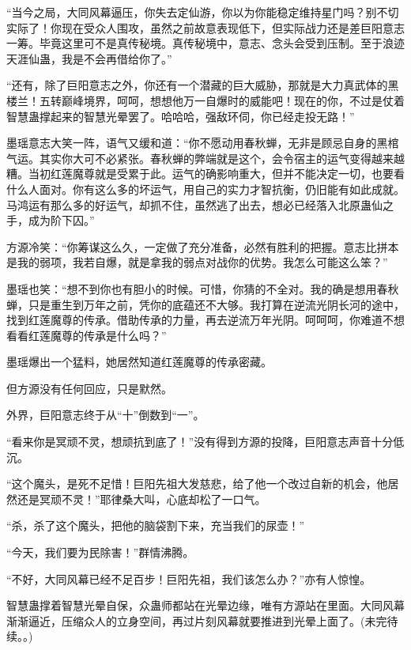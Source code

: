 \begin{this_body}
“当今之局，大同风幕逼压，你失去定仙游，你以为你能稳定维持星门吗？别不切实际了！你现在受众人围攻，虽然之前故意表现低下，但实际战力还是差巨阳意志一筹。毕竟这里可不是真传秘境。真传秘境中，意志、念头会受到压制。至于浪迹天涯仙蛊，我是不会再借给你了。”

“还有，除了巨阳意志之外，你还有一个潜藏的巨大威胁，那就是大力真武体的黑楼兰！五转巅峰境界，呵呵，想想他万一自爆时的威能吧！现在的你，不过是仗着智慧蛊撑起来的智慧光晕罢了。哈哈哈，强敌环伺，你已经走投无路！”

墨瑶意志大笑一阵，语气又缓和道：“你不愿动用春秋蝉，无非是顾忌自身的黑棺气运。其实你大可不必紧张。春秋蝉的弊端就是这个，会令宿主的运气变得越来越糟。当初红莲魔尊就是受累于此。运气的确影响重大，但并不能决定一切，也要看什么人面对。你有这么多的坏运气，用自己的实力才智抗衡，仍旧能有如此成就。马鸿运有那么多的好运气，却抓不住，虽然逃了出去，想必已经落入北原蛊仙之手，成为阶下囚。”

方源冷笑：“你筹谋这么久，一定做了充分准备，必然有胜利的把握。意志比拼本是我的弱项，我若自爆，就是拿我的弱点对战你的优势。我怎么可能这么笨？”

墨瑶也笑：“想不到你也有胆小的时候。可惜，你猜的不全对。我的确是想用春秋蝉，只是重生到万年之前，凭你的底蕴还不大够。我打算在逆流光阴长河的途中，找到红莲魔尊的传承。借助传承的力量，再去逆流万年光阴。呵呵呵，你难道不想看看红莲魔尊的传承是什么吗？”

墨瑶爆出一个猛料，她居然知道红莲魔尊的传承密藏。

但方源没有任何回应，只是默然。

外界，巨阳意志终于从“十”倒数到“一”。

“看来你是冥顽不灵，想顽抗到底了！”没有得到方源的投降，巨阳意志声音十分低沉。

“这个魔头，是死不足惜！巨阳先祖大发慈悲，给了他一个改过自新的机会，他居然还是冥顽不灵！”耶律桑大叫，心底却松了一口气。

“杀，杀了这个魔头，把他的脑袋割下来，充当我们的尿壶！”

“今天，我们要为民除害！”群情沸腾。

“不好，大同风幕已经不足百步！巨阳先祖，我们该怎么办？”亦有人惊惶。

智慧蛊撑着智慧光晕自保，众蛊师都站在光晕边缘，唯有方源站在里面。大同风幕渐渐逼近，压缩众人的立身空间，再过片刻风幕就要推进到光晕上面了。(未完待续。。)

\end{this_body}

